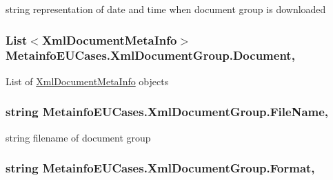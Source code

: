 string representation of date and time when document group is downloaded 

\hypertarget{class_metainfo_e_u_cases_1_1_xml_document_group_a1139a3ec22f91f2645b8fcd528b43c04}{
\subsubsection[{Document}]{\setlength{\rightskip}{0pt plus 5cm}List$<${\bf Xml\-Document\-Meta\-Info}$>$ Metainfo\-E\-U\-Cases.\-Xml\-Document\-Group.\-Document\hspace{0.3cm}{\ttfamily [get]}, {\ttfamily [set]}}}\label{class_metainfo_e_u_cases_1_1_xml_document_group_a1139a3ec22f91f2645b8fcd528b43c04}


List of \hyperlink{class_metainfo_e_u_cases_1_1_xml_document_meta_info}{Xml\-Document\-Meta\-Info} objects 

\hypertarget{class_metainfo_e_u_cases_1_1_xml_document_group_a1c3693931b6b015fc34d24baa9e1a3ca}{
\subsubsection[{File\-Name}]{\setlength{\rightskip}{0pt plus 5cm}string Metainfo\-E\-U\-Cases.\-Xml\-Document\-Group.\-File\-Name\hspace{0.3cm}{\ttfamily [get]}, {\ttfamily [set]}}}\label{class_metainfo_e_u_cases_1_1_xml_document_group_a1c3693931b6b015fc34d24baa9e1a3ca}


string filename of document group 

\hypertarget{class_metainfo_e_u_cases_1_1_xml_document_group_a96eb3e67b5c92e28c00cab5d216872d4}{
\subsubsection[{Format}]{\setlength{\rightskip}{0pt plus 5cm}string Metainfo\-E\-U\-Cases.\-Xml\-Document\-Group.\-Format\hspace{0.3cm}{\ttfamily [get]}, {\ttfamily [set]}}}\label{class_metainfo_e_u_cases_1_1_xml_document_group_a96eb3e67b5c92e28c00cab5d216872d4}


